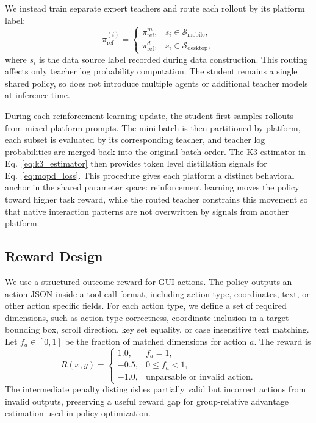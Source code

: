 We instead train separate expert teachers and route each rollout by its
platform label:
\begin{equation}
\pi_{\mathrm{ref}}^{(i)}
=
\begin{cases}
\pi_{\mathrm{ref}}^{m},
& s_i \in \mathcal{S}_{\mathrm{mobile}},\\
\pi_{\mathrm{ref}}^{d},
& s_i \in \mathcal{S}_{\mathrm{desktop}},
\end{cases}
\label{eq:teacher_routing}
\end{equation}
where $s_i$ is the data source label recorded during data construction.
This routing affects only teacher log probability computation. The student
remains a single shared policy, so \METHODNAME does not introduce multiple
agents or additional teacher models at inference time.


During each reinforcement learning update, the student first samples
rollouts from mixed platform prompts. The mini-batch is then partitioned by
platform, each subset is evaluated by its corresponding teacher, and teacher
log probabilities are merged back into the original batch order. The K3
estimator in Eq.~\ref{eq:k3_estimator} then provides token level
distillation signals for Eq.~\ref{eq:mopd_loss}. This procedure gives each
platform a distinct behavioral anchor in the shared parameter space:
reinforcement learning moves the policy toward higher task reward, while
the routed teacher constrains this movement so that native interaction
patterns are not overwritten by signals from another platform.

\subsection{Reward Design}
\label{sec:reward_design}

We use a structured outcome reward for GUI actions. The policy outputs an
action JSON inside a tool-call format, including action type, coordinates,
text, or other action specific fields. For each action type, we define a set
of required dimensions, such as action type correctness, coordinate
inclusion in a target bounding box, scroll direction, key set equality, or
case insensitive text matching. Let $f_a\in[0,1]$ be the fraction of matched
dimensions for action $a$. The reward is
\begin{equation}
R(x,y)
=
\begin{cases}
1.0, & f_a = 1,\\
-0.5, & 0 \leq f_a < 1,\\
-1.0, & \text{unparsable or invalid action}.
\end{cases}
\label{eq:action_reward}
\end{equation}
The intermediate penalty distinguishes partially valid but incorrect
actions from invalid outputs, preserving a useful reward gap for
group-relative advantage estimation used in policy optimization.

